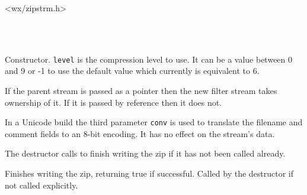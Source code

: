 


<wx/zipstrm.h>




\\
\\



\label{wxzipoutputstreamwxzipoutputstream}



Constructor. {\tt level} is the compression level to use.
It can be a value between 0 and 9 or -1 to use the default value
which currently is equivalent to 6.

If the parent stream is passed as a pointer then the new filter stream
takes ownership of it. If it is passed by reference then it does not.

In a Unicode build the third parameter {\tt conv} is used to translate
the filename and comment fields to an 8-bit encoding. It has no effect on the
stream's data.


\label{wxzipoutputstreamdtor}


The destructor calls  to finish
writing the zip if it has not been called already.


\label{wxzipoutputstreamclose}


Finishes writing the zip, returning true if successful.
Called by the destructor if not called explicitly.


\label{wxzipoutputstreamcloseentry}

